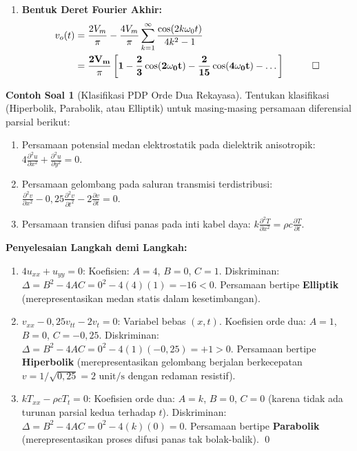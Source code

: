 \documentclass[11pt,a4paper]{article}
\theoremstyle{definition}
\newtheorem{example}{Contoh Soal}[section]
\begin{document}
\begin{enumerate}[leftmargin=*]
    \item \textbf{Bentuk Deret Fourier Akhir:}
    \begin{align*}
        v_o(t) &= \frac{2 V_m}{\pi} - \frac{4 V_m}{\pi} \sum_{k=1}^{\infty} \frac{\cos(2k \omega_0 t)}{4k^2 - 1} \\
               &= \mathbf{\frac{2 V_m}{\pi} \left[ 1 - \frac{2}{3}\cos(2\omega_0 t) - \frac{2}{15}\cos(4\omega_0 t) - \dots \right]} \quad \qed
    \end{align*}
\end{enumerate}

\begin{example}[Klasifikasi PDP Orde Dua Rekayasa]
Tentukan klasifikasi (Hiperbolik, Parabolik, atau Elliptik) untuk masing-masing persamaan diferensial parsial berikut:
\begin{enumerate}[leftmargin=*]
    \item Persamaan potensial medan elektrostatik pada dielektrik anisotropik: $4 \frac{\partial^2 u}{\partial x^2} + \frac{\partial^2 u}{\partial y^2} = 0$.
    \item Persamaan gelombang pada saluran transmisi terdistribusi: $\frac{\partial^2 v}{\partial x^2} - 0{,}25 \frac{\partial^2 v}{\partial t^2} - 2 \frac{\partial v}{\partial t} = 0$.
    \item Persamaan transien difusi panas pada inti kabel daya: $k \frac{\partial^2 T}{\partial x^2} = \rho c \frac{\partial T}{\partial t}$.
\end{enumerate}
\end{example}

\noindent\textbf{Penyelesaian Langkah demi Langkah:}
\begin{enumerate}[leftmargin=*]
    \item $4 u_{xx} + u_{yy} = 0$:
    Koefisien: $A = 4$, $B = 0$, $C = 1$.
    Diskriminan: $\Delta = B^2 - 4AC = 0^2 - 4(4)(1) = -16 < 0$.
    Persamaan bertipe \textbf{Elliptik} (merepresentasikan medan statis dalam kesetimbangan).
    
    \item $v_{xx} - 0{,}25 v_{tt} - 2 v_t = 0$:
    Variabel bebas $(x, t)$. Koefisien orde dua: $A = 1$, $B = 0$, $C = -0{,}25$.
    Diskriminan: $\Delta = B^2 - 4AC = 0^2 - 4(1)(-0{,}25) = +1 > 0$.
    Persamaan bertipe \textbf{Hiperbolik} (merepresentasikan gelombang berjalan berkecepatan $v = 1/\sqrt{0{,}25} = 2\text{ unit/s}$ dengan redaman resistif).
    
    \item $k T_{xx} - \rho c T_t = 0$:
    Koefisien orde dua: $A = k$, $B = 0$, $C = 0$ (karena tidak ada turunan parsial kedua terhadap $t$).
    Diskriminan: $\Delta = B^2 - 4AC = 0^2 - 4(k)(0) = 0$.
    Persamaan bertipe \textbf{Parabolik} (merepresentasikan proses difusi panas tak bolak-balik). \qed
\end{enumerate}
\end{document}
